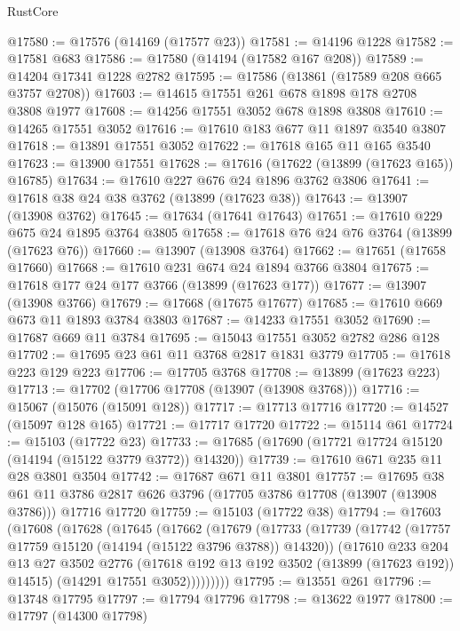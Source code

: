 \begin{lexlean}{RustCore}
\begin{coremodule}
@17580 := @17576 (@14169 (@17577 @23))
@17581 := @14196 @1228
@17582 := @17581 @683
@17586 := @17580 (@14194 (@17582 @167 @208))
@17589 := @14204 @17341 @1228 @2782
@17595 := @17586 (@13861 (@17589 @208 @665 @3757 @2708))
@17603 := @14615 @17551 @261 @678 @1898 @178 @2708 @3808 @1977
@17608 := @14256 @17551 @3052 @678 @1898 @3808
@17610 := @14265 @17551 @3052
@17616 := @17610 @183 @677 @11 @1897 @3540 @3807
@17618 := @13891 @17551 @3052
@17622 := @17618 @165 @11 @165 @3540
@17623 := @13900 @17551
@17628 := @17616 (@17622 (@13899 (@17623 @165)) @16785)
@17634 := @17610 @227 @676 @24 @1896 @3762 @3806
@17641 := @17618 @38 @24 @38 @3762 (@13899 (@17623 @38))
@17643 := @13907 (@13908 @3762)
@17645 := @17634 (@17641 @17643)
@17651 := @17610 @229 @675 @24 @1895 @3764 @3805
@17658 := @17618 @76 @24 @76 @3764 (@13899 (@17623 @76))
@17660 := @13907 (@13908 @3764)
@17662 := @17651 (@17658 @17660)
@17668 := @17610 @231 @674 @24 @1894 @3766 @3804
@17675 := @17618 @177 @24 @177 @3766 (@13899 (@17623 @177))
@17677 := @13907 (@13908 @3766)
@17679 := @17668 (@17675 @17677)
@17685 := @17610 @669 @673 @11 @1893 @3784 @3803
@17687 := @14233 @17551 @3052
@17690 := @17687 @669 @11 @3784
@17695 := @15043 @17551 @3052 @2782 @286 @128
@17702 := @17695 @23 @61 @11 @3768 @2817 @1831 @3779
@17705 := @17618 @223 @129 @223
@17706 := @17705 @3768
@17708 := @13899 (@17623 @223)
@17713 := @17702 (@17706 @17708 (@13907 (@13908 @3768)))
@17716 := @15067 (@15076 (@15091 @128))
@17717 := @17713 @17716
@17720 := @14527 (@15097 @128 @165)
@17721 := @17717 @17720
@17722 := @15114 @61
@17724 := @15103 (@17722 @23)
@17733 := @17685 (@17690 (@17721 @17724 @15120 (@14194 (@15122 @3779 @3772)) @14320))
@17739 := @17610 @671 @235 @11 @28 @3801 @3504
@17742 := @17687 @671 @11 @3801
@17757 := @17695
    @38
    @61
    @11
    @3786
    @2817
    @626
    @3796
    (@17705 @3786 @17708 (@13907 (@13908 @3786)))
    @17716
    @17720
@17759 := @15103 (@17722 @38)
@17794 := @17603
    (@17608
      (@17628
        (@17645
          (@17662
            (@17679
              (@17733
                (@17739
                  (@17742 (@17757 @17759 @15120 (@14194 (@15122 @3796 @3788)) @14320))
                  (@17610
                    @233
                    @204
                    @13
                    @27
                    @3502
                    @2776
                    (@17618 @192 @13 @192 @3502 (@13899 (@17623 @192)) @14515)
                    (@14291 @17551 @3052)))))))))
@17795 := @13551 @261
@17796 := @13748 @17795
@17797 := @17794 @17796
@17798 := @13622 @1977
@17800 := @17797 (@14300 @17798)

\end{coremodule}
\end{lexlean}
